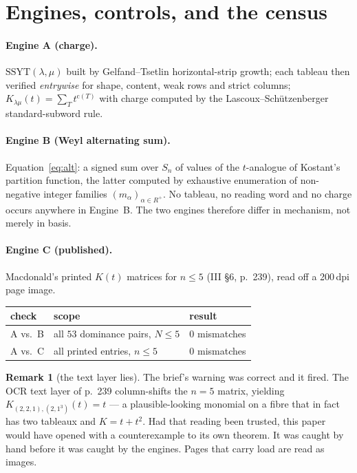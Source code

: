 \documentclass[11pt]{article}
\theoremstyle{plain}
\theoremstyle{definition}
\newtheorem{remark}[theorem]{Remark}
\newcommand{\SSYT}{\mathrm{SSYT}}
\newcommand{\charge}{\mathrm{c}}
\begin{document}
\section{Engines, controls, and the census}\label{sec:census}

\paragraph{Engine A (charge).}  $\SSYT(\lambda,\mu)$ built by Gelfand--Tsetlin
horizontal-strip growth; each tableau then verified \emph{entrywise} for shape, content,
weak rows and strict columns; $K_{\lambda\mu}(t)=\sum_T t^{\charge(T)}$ with charge
computed by the Lascoux--Schützenberger standard-subword rule.

\paragraph{Engine B (Weyl alternating sum).}  Equation~\eqref{eq:alt}: a signed sum over
$S_n$ of values of the $t$-analogue of Kostant's partition function, the latter computed
by exhaustive enumeration of non-negative integer families $(m_\alpha)_{\alpha\in R^+}$.
No tableau, no reading word and no charge occurs anywhere in Engine~B.  The two engines
therefore differ in mechanism, not merely in basis.

\paragraph{Engine C (published).}  Macdonald's printed $K(t)$ matrices for $n\le 5$
(III \S6, p.\ 239), read off a 200\,dpi page image.

\begin{center}
\begin{tabular}{lll}
\hline
check & scope & result\\
\hline
A vs.\ B & all $53$ dominance pairs, $N\le5$ & $0$ mismatches\\
A vs.\ C & all printed entries, $n\le5$ & $0$ mismatches\\
\hline
\end{tabular}
\end{center}

\begin{remark}[the text layer lies]
The brief's warning was correct and it fired.  The OCR text layer of p.\ 239 column-shifts
the $n=5$ matrix, yielding \emph{$K_{(2,2,1),(2,1^3)}(t)=t$} --- a plausible-looking
monomial on a fibre that in fact has two tableaux and $K=t+t^2$.  Had that reading been
trusted, this paper would have opened with a counterexample to its own theorem.  It was
caught by hand before it was caught by the engines.  Pages that carry load are read as
images.
\end{remark}
\end{document}
